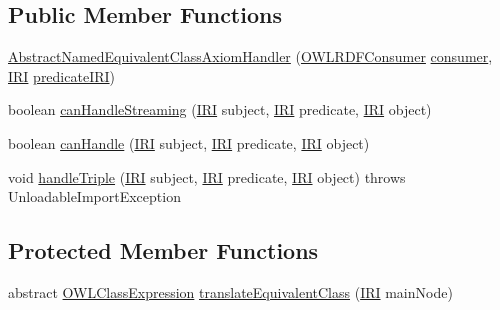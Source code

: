 \subsection*{Public Member Functions}
\begin{DoxyCompactItemize}
\item 
\hyperlink{classorg_1_1coode_1_1owlapi_1_1rdfxml_1_1parser_1_1_abstract_named_equivalent_class_axiom_handler_add0540d5cafb76b3f952d58de66832e1}{Abstract\-Named\-Equivalent\-Class\-Axiom\-Handler} (\hyperlink{classorg_1_1coode_1_1owlapi_1_1rdfxml_1_1parser_1_1_o_w_l_r_d_f_consumer}{O\-W\-L\-R\-D\-F\-Consumer} \hyperlink{classorg_1_1coode_1_1owlapi_1_1rdfxml_1_1parser_1_1_abstract_triple_handler_a4ccf4d898ff01eb1cadfa04b23d54e9c}{consumer}, \hyperlink{classorg_1_1semanticweb_1_1owlapi_1_1model_1_1_i_r_i}{I\-R\-I} \hyperlink{classorg_1_1coode_1_1owlapi_1_1rdfxml_1_1parser_1_1_triple_predicate_handler_a9d6bb836fac09ff7f53774459cb67109}{predicate\-I\-R\-I})
\item 
boolean \hyperlink{classorg_1_1coode_1_1owlapi_1_1rdfxml_1_1parser_1_1_abstract_named_equivalent_class_axiom_handler_ae10eb09915e33e5547da78556b54c271}{can\-Handle\-Streaming} (\hyperlink{classorg_1_1semanticweb_1_1owlapi_1_1model_1_1_i_r_i}{I\-R\-I} subject, \hyperlink{classorg_1_1semanticweb_1_1owlapi_1_1model_1_1_i_r_i}{I\-R\-I} predicate, \hyperlink{classorg_1_1semanticweb_1_1owlapi_1_1model_1_1_i_r_i}{I\-R\-I} object)
\item 
boolean \hyperlink{classorg_1_1coode_1_1owlapi_1_1rdfxml_1_1parser_1_1_abstract_named_equivalent_class_axiom_handler_a835c86f211868db4cae61d04917298c8}{can\-Handle} (\hyperlink{classorg_1_1semanticweb_1_1owlapi_1_1model_1_1_i_r_i}{I\-R\-I} subject, \hyperlink{classorg_1_1semanticweb_1_1owlapi_1_1model_1_1_i_r_i}{I\-R\-I} predicate, \hyperlink{classorg_1_1semanticweb_1_1owlapi_1_1model_1_1_i_r_i}{I\-R\-I} object)
\item 
void \hyperlink{classorg_1_1coode_1_1owlapi_1_1rdfxml_1_1parser_1_1_abstract_named_equivalent_class_axiom_handler_a7e89640d855888a27c349d8c886209f3}{handle\-Triple} (\hyperlink{classorg_1_1semanticweb_1_1owlapi_1_1model_1_1_i_r_i}{I\-R\-I} subject, \hyperlink{classorg_1_1semanticweb_1_1owlapi_1_1model_1_1_i_r_i}{I\-R\-I} predicate, \hyperlink{classorg_1_1semanticweb_1_1owlapi_1_1model_1_1_i_r_i}{I\-R\-I} object)  throws Unloadable\-Import\-Exception 
\end{DoxyCompactItemize}
\subsection*{Protected Member Functions}
\begin{DoxyCompactItemize}
\item 
abstract \hyperlink{interfaceorg_1_1semanticweb_1_1owlapi_1_1model_1_1_o_w_l_class_expression}{O\-W\-L\-Class\-Expression} \hyperlink{classorg_1_1coode_1_1owlapi_1_1rdfxml_1_1parser_1_1_abstract_named_equivalent_class_axiom_handler_ae27dd1195983d081500e4c20dfc3552d}{translate\-Equivalent\-Class} (\hyperlink{classorg_1_1semanticweb_1_1owlapi_1_1model_1_1_i_r_i}{I\-R\-I} main\-Node)
\end{DoxyCompactItemize}


